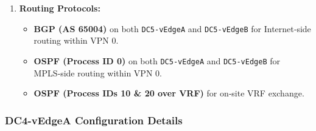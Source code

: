 \documentclass[12pt,english]{report}
\begin{document}
\begin{enumerate}
    \item \textbf{Routing Protocols:}
    \begin{itemize}
        \item \textbf{BGP (AS 65004)} on both \texttt{DC5‑vEdgeA} and \texttt{DC5‑vEdgeB} for Internet‑side routing within VPN 0.
        \item \textbf{OSPF (Process ID 0)} on both \texttt{DC5‑vEdgeA} and \texttt{DC5‑vEdgeB} for MPLS‑side routing within VPN 0.
        \item \textbf{OSPF (Process IDs 10 \& 20 over VRF)} for on‑site VRF exchange.
    \end{itemize}
\end{enumerate}
\subsubsection{DC4-vEdgeA Configuration Details}
\end{document}
